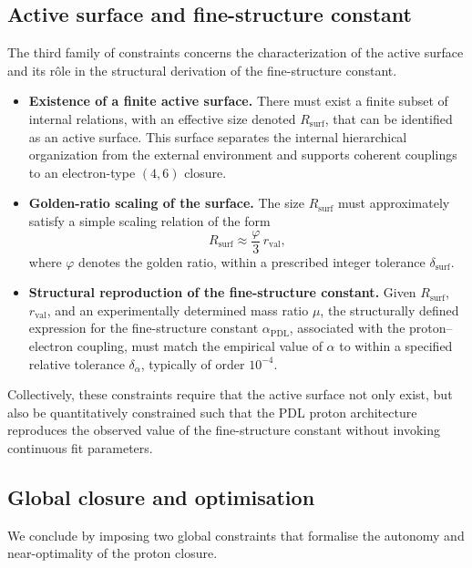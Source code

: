 \documentclass[11pt,a4paper]{article}
\theoremstyle{definition}
\newcommand{\PDL}{\mathrm{PDL}}
\begin{document}
\subsection{Active surface and fine-structure constant}

The third family of constraints concerns the characterization of the active surface and its rôle in the structural derivation of the fine-structure constant.

\begin{itemize}
  \item[(C8)] \textbf{Existence of a finite active surface.} There must exist a finite subset of internal relations, with an effective size denoted $R_{\mathrm{surf}}$, that can be identified as an active surface. This surface separates the internal hierarchical organization from the external environment and supports coherent couplings to an electron-type $(4,6)$ closure.\cite{Effective_Fields_PDL_2026,Combinatorial_Proton_v2_2026}
  \item[(C9)] \textbf{Golden-ratio scaling of the surface.} The size $R_{\mathrm{surf}}$ must approximately satisfy a simple scaling relation of the form
  \[
   R_{\mathrm{surf}} \approx \frac{\varphi}{3}\, r_{\mathrm{val}},
  \]
  where $\varphi$ denotes the golden ratio, within a prescribed integer tolerance $\delta_{\mathrm{surf}}$.\cite{Golden_Ratio_Sketch_2026,Alpha_PDL_v2_2026}
  \item[(C10)] \textbf{Structural reproduction of the fine-structure constant.} Given $R_{\mathrm{surf}}$, $r_{\mathrm{val}}$, and an experimentally determined mass ratio $\mu$, the structurally defined expression for the fine-structure constant $\alpha_{\PDL}$, associated with the proton–electron coupling, must match the empirical value of $\alpha$ to within a specified relative tolerance $\delta_{\alpha}$, typically of order $10^{-4}$.\cite{Alpha_PDL_v2_2026}
\end{itemize}

Collectively, these constraints require that the active surface not only exist, but also be quantitatively constrained such that the PDL proton architecture reproduces the observed value of the fine-structure constant without invoking continuous fit parameters.

\subsection{Global closure and optimisation}

We conclude by imposing two global constraints that formalise the autonomy and near-optimality of the proton closure.
\end{document}
